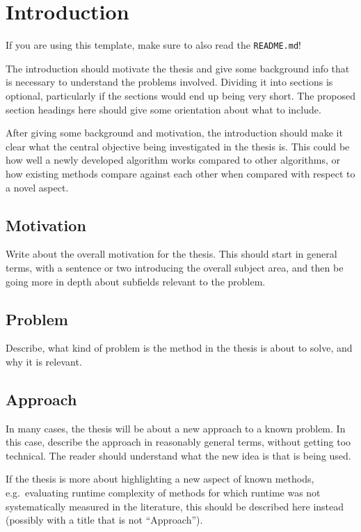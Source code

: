 \chapter{Introduction}\label{chap:introduction}

If you are using this template, make sure to also read the \texttt{README.md}!

The introduction should motivate the thesis and give some background info that is necessary to understand the problems involved.
Dividing it into sections is optional, particularly if the sections would end up being very short.
The proposed section headings here should give some orientation about what to include.

After giving some background and motivation, the introduction should make it clear what the central objective being investigated in the thesis is.
This could be how well a newly developed algorithm works compared to other algorithms, or how existing methods compare against each other when compared with respect to a novel aspect.

\section{Motivation}

Write about the overall motivation for the thesis.
This should start in general terms, with a sentence or two introducing the overall subject area, and then be going more in depth about subfields relevant to the problem.

\section{Problem}

Describe, what kind of problem is the method in the thesis is about to solve, and why it is relevant.

\section{Approach}

In many cases, the thesis will be about a new approach to a known problem.
In this case, describe the approach in reasonably general terms, without getting too technical.
The reader should understand what the new idea is that is being used.

If the thesis is more about highlighting a new aspect of known methods, e.g.\ evaluating runtime complexity of methods for which runtime was not systematically measured in the literature, this should be described here instead (possibly with a title that is not ``Approach'').


